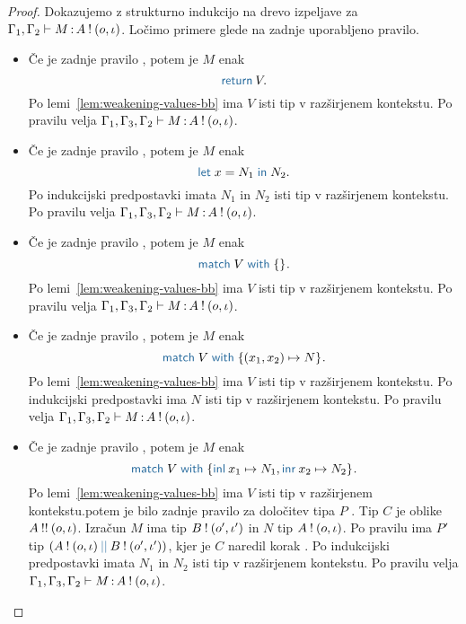 \begin{proof}
	Dokazujemo z strukturno indukcijo na drevo izpeljave za $\Gamma_1, \Gamma_2 \vdash M \mathinner{:} A \mathbin{!} (o, \iota)$.
	Ločimo primere glede na zadnje uporabljeno pravilo.
	
	\begin{itemize}
		\item Če je zadnje pravilo , potem je $M$ enak $$\tmreturn{V}.$$
		Po lemi~\ref{lem:weakening-values-bb} ima $V$ isti tip v razširjenem kontekstu.
		Po pravilu  velja $\Gamma_1, \Gamma_3, \Gamma_2 \vdash M \mathinner{:} A \mathbin{!} (o, \iota)$.
		
		\item Če je zadnje pravilo , potem je $M$ enak $$\tmlet{x}{N_1}{N_2}.$$
		Po indukcijski predpostavki imata $N_1$ in $N_2$ isti tip v razširjenem kontekstu.
		Po pravilu  velja $\Gamma_1, \Gamma_3, \Gamma_2 \vdash M \mathinner{:} A \mathbin{!} (o, \iota)$.
		
		\item Če je zadnje pravilo , potem je $M$ enak $$\tmmatch{V}{}.$$
		Po lemi~\ref{lem:weakening-values-bb} ima $V$ isti tip v razširjenem kontekstu.
		Po pravilu  velja $\Gamma_1, \Gamma_3, \Gamma_2 \vdash M \mathinner{:} A \mathbin{!} (o, \iota)$.
		
		\item Če je zadnje pravilo , potem je $M$ enak $$\tmmatch{V}{(x_1,x_2) \mapsto N}.$$ 
		Po lemi~\ref{lem:weakening-values-bb} ima $V$ isti tip v razširjenem kontekstu.
		Po indukcijski predpostavki ima $N$ isti tip v razširjenem kontekstu.
		Po pravilu  velja $\Gamma_1, \Gamma_3, \Gamma_2 \vdash M \mathinner{:} A \mathbin{!} (o, \iota)$.
		
		\item Če je zadnje pravilo , potem je $M$ enak $$\tmmatch{V}{\tminl{x_1} \mapsto N_1, \tminr{x_2} \mapsto N_2}.$$
		Po lemi~\ref{lem:weakening-values-bb} ima $V$ isti tip v razširjenem kontekstu.potem je bilo zadnje pravilo za določitev tipa $P$ . Tip $C$ je oblike $A \mathbin{!!} (o, \iota)$.
		Izračun $M$ ima tip $B \mathbin{!} (o', \iota')$ in $N$ tip $A \mathbin{!} (o, \iota)$.
		Po pravilu  ima $P'$ tip $\typar{\tycomp{A}{\o, \i}}{\tycomp{B}{\o', \i'}}$, kjer je $C$ naredil korak .
		Po indukcijski predpostavki imata $N_1$ in $N_2$ isti tip v razširjenem kontekstu.
		Po pravilu  velja $\Gamma_1, \Gamma_3, \Gamma_2 \vdash M \mathinner{:} A \mathbin{!} (o, \iota)$.
		

\end{itemize}
\end{proof}
